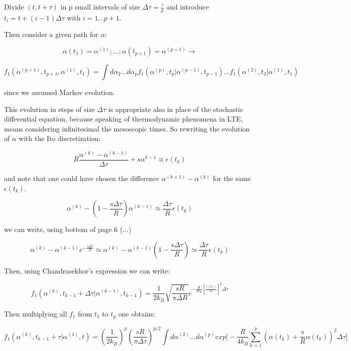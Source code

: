 \documentclass{article}
\begin{document}
Divide $(t,t+\tau)$ in p small intervals of size $\Delta \tau = \frac{\tau}{p}$ and introduce $t_i = t +(i-1)\Delta \tau$ with $i=1...p+1$.

Then consider a given path for $\alpha$:

$$ \alpha(t_1) = \alpha^{(1)};...; \alpha(t_{p+1}) = \alpha^{(p+1)} \rightarrow $$

$$f_1(\alpha^{(p+1)},t_{p+1},\alpha^{(1)},t_1) = \int d\alpha_2 ... d\alpha_p f_1(\alpha^{(p)},t_p|\alpha^{(p-1)},t_{p-1}) ...  f_1(\alpha^{(2)},t_2|\alpha^{(1)},t_{1})$$

since we assumed Markov evolution.

This evolution in steps of size $\Delta \tau$ is appropriate also in place of the stochastic differential equation, because speaking of thermodynamic phenomena in LTE, means considering infinitesimal the mesoscopic times. So rewriting the evolution of $\alpha$ with the Ito discretization:

\begin{equation}
R \frac{\alpha^{(k)} - \alpha^{(k-1)}}{ \Delta \tau} + s \alpha^{k-1} \approx \epsilon(t_k)
\end{equation}

and note that one could have chosen the difference $\alpha^{(k+1)} - \alpha^{(k)}$ for the same $\epsilon(t_k)$.

$$ \alpha^{(k)} - (1-\frac{s \Delta \tau }{R}) \alpha^{(k-1)} \approx \frac{\Delta \tau }{R} \epsilon (t_k)$$

we can write, using bottom of page 6 (...) 

$$ \alpha^{(k)} - \alpha^{(k-1)}e^{-\frac{s \Delta \tau}{R}} \simeq \alpha^{(k)} - \alpha^{(k-1)}(1-\frac{s \Delta \tau}{R}) \simeq \frac{ \Delta \tau}{R} \epsilon(t_k)$$

Then, using Chandrasekhor's expression we can write:

$$ f_1(\alpha^{(k)},t_{k-1}+\Delta \tau| \alpha^{(k-1)},t_{k-1}) = \frac{1}{2 k_B} \sqrt{\frac{sR}{\pi \Delta R}} e^{-\frac{R}{4 k_B} [\frac{\epsilon(t_k)}{R}]^2 \Delta \tau } $$

Then multiplying all $f_1$ from $t_1$ to $t_p$ one obtains:

\begin{equation}
f_1(\alpha^{(k)},t_{k-1} + \tau| \alpha^{(1)},t) = (\frac{1}{2 k_B})^p (\frac{sR}{\pi \Delta \tau})^{p/2} \int d\alpha^{(2)}...d\alpha^{(p)} exp \Big [-\frac{R}{4 k_B} \sum_{k=1}^{p}(\dot{\alpha}(t_k) + \frac{s}{R}\alpha(t_k))^2 \Delta \tau \Big ]
\end{equation}
\end{document}
